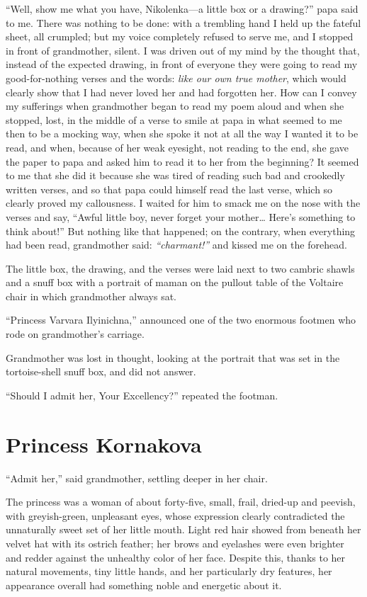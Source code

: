 ``Well, show me what you have, Nikolenka---a little box or a drawing?'' papa said to me. There was nothing to be done: with a trembling hand I held up the fateful sheet, all crumpled; but my voice completely refused to serve me, and I stopped in front of grandmother, silent. I was driven out of my mind by the thought that, instead of the expected drawing, in front of everyone they were going to read my good-for-nothing verses and the words: \textit{like our own true mother}, which would clearly show that I had never loved her and had forgotten her. How can I convey my sufferings when grandmother began to read my poem aloud and when she stopped, lost, in the middle of a verse to smile at papa in what seemed to me then to be a mocking way, when she spoke it not at all the way I wanted it to be read, and when, because of her weak eyesight, not reading to the end, she gave the paper to papa and asked him to read it to her from the beginning? It seemed to me that she did it because she was tired of reading such bad and crookedly written verses, and so that papa could himself read the last verse, which so clearly proved my callousness. I waited for him to smack me on the nose with the verses and say, ``Awful little boy, never forget your mother\ldots{} Here's something to think about!'' But nothing like that happened; on the contrary, when everything had been read, grandmother said: \textit{``charmant!''} and kissed me on the forehead. %

The little box, the drawing, and the verses were laid next to two cambric shawls and a snuff box with a portrait of maman on the pullout table of the Voltaire chair in which grandmother always sat.

``Princess Varvara Ilyinichna,'' announced one of the two enormous footmen who rode on grandmother's carriage. %

Grandmother was lost in thought, looking at the portrait that was set in the tortoise-shell snuff box, and did not answer.

``Should I admit her, Your Excellency?'' repeated the footman.

\chapter{Princess Kornakova} %

``Admit her,'' said grandmother, settling deeper in her chair.

The princess was a woman of about forty-five, small, frail, dried-up and peevish, with greyish-green, unpleasant eyes, whose expression clearly contradicted the unnaturally sweet set of her little mouth. Light red hair showed from beneath her velvet hat with its ostrich feather; her brows and eyelashes were even brighter and redder against the unhealthy color of her face. Despite this, thanks to her natural movements, tiny little hands, and her particularly dry features, her appearance overall had something noble and energetic about it.

